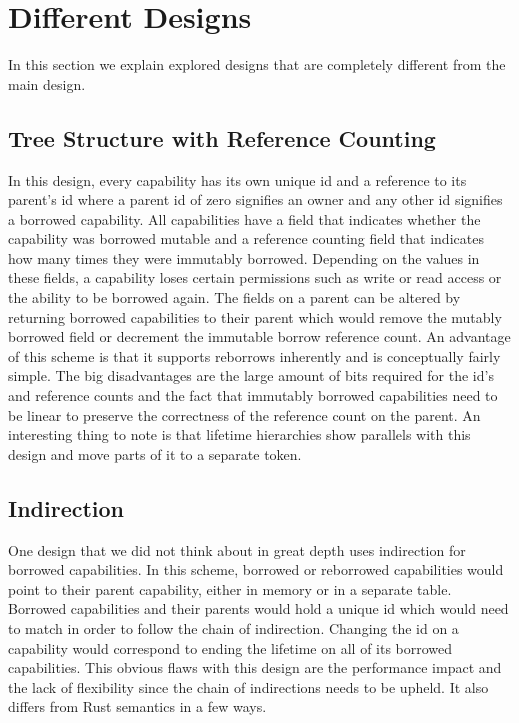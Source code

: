 \section{Different Designs}
In this section we explain explored designs that are completely different from the main design.

\subsection{Tree Structure with Reference Counting}
In this design, every capability has its own unique id and a reference to its parent's id where a parent id of zero signifies an owner and any other id signifies a borrowed capability.
All capabilities have a field that indicates whether the capability was borrowed mutable and a reference counting field that indicates how many times they were immutably borrowed.
Depending on the values in these fields, a capability loses certain permissions such as write or read access or the ability to be borrowed again.
The fields on a parent can be altered by returning borrowed capabilities to their parent which would remove the mutably borrowed field or decrement the immutable borrow reference count.
An advantage of this scheme is that it supports reborrows inherently and is conceptually fairly simple.
The big disadvantages are the large amount of bits required for the id's and reference counts and the fact that immutably borrowed capabilities need to be linear to preserve the correctness of the reference count on the parent.
An interesting thing to note is that lifetime hierarchies show parallels with this design and move parts of it to a separate token.

\subsection{Indirection}
One design that we did not think about in great depth uses indirection for borrowed capabilities.
In this scheme, borrowed or reborrowed capabilities would point to their parent capability, either in memory or in a separate table.
Borrowed capabilities and their parents would hold a unique id which would need to match in order to follow the chain of indirection.
Changing the id on a capability would correspond to ending the lifetime on all of its borrowed capabilities.
This obvious flaws with this design are the performance impact and the lack of flexibility since the chain of indirections needs to be upheld.
It also differs from Rust semantics in a few ways.
